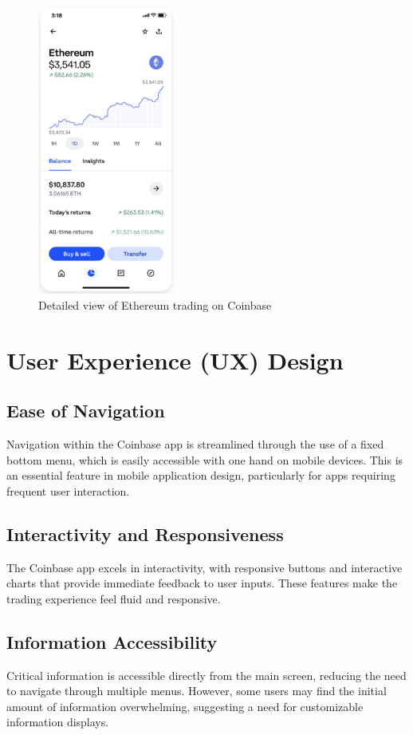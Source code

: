 \documentclass[12pt]{article}
\begin{document}
\begin{figure}[H]
    \centering
    \includegraphics[width=0.4\textwidth]{img/screenshot2.png}
    \caption{Detailed view of Ethereum trading on Coinbase}
\end{figure}

\section{User Experience (UX) Design}

\subsection{Ease of Navigation}
Navigation within the Coinbase app is streamlined through the use of a fixed bottom menu, which is easily accessible with one hand on mobile devices. This is an essential feature in mobile application design, particularly for apps requiring frequent user interaction.

\subsection{Interactivity and Responsiveness}
The Coinbase app excels in interactivity, with responsive buttons and interactive charts that provide immediate feedback to user inputs. These features make the trading experience feel fluid and responsive.

\subsection{Information Accessibility}
Critical information is accessible directly from the main screen, reducing the need to navigate through multiple menus. However, some users may find the initial amount of information overwhelming, suggesting a need for customizable information displays.
\end{document}
